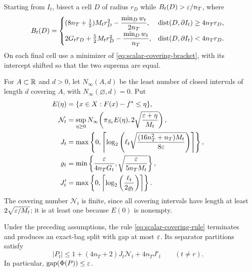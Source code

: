 Starting from $I_t$, bisect a cell $D$ of radius $r_D$ while
$B_t(D)>\varepsilon/n_T$, where
\begin{equation}
 B_t(D)=
 \begin{cases}
  (8n_T+\tfrac12)M_t r_D^2-\dfrac{\min_D w_t}{2n_T},
     &\operatorname{dist}(D,\partial I_t)\geq4n_T r_D,\\[2mm]
  2G_t r_D+\tfrac52M_t r_D^2-\dfrac{\min_D w_t}{n_T},
     &\operatorname{dist}(D,\partial I_t)<4n_T r_D.
 \end{cases}
 \label{eq:scalar-covering-rule}
\end{equation}
On each final cell use a minimizer of
\eqref{eq:scalar-covering-bracket}, with its intercept shifted so that
the two suprema are equal.

For $A\subset\mathbb R$ and $d>0$, let $N_\infty(A,d)$ be the least number of
closed intervals of length $d$ covering $A$, with
$N_\infty(\varnothing,d)=0$.  Put
\begin{align}
 E(\eta)&=\{x\in X:F(x)-f^*\leq\eta\},\\
 \mathcal N_t&=\sup_{\eta\geq0}
 N_\infty\!\left(\pi_{S_t}E(\eta),
                   2\sqrt{\frac{\varepsilon+\eta}{M_t}}\right),\\
 J_t&=\max\left\{0,
 \left\lceil \log_2\left(\ell_t\sqrt{
             \frac{(16n_T^2+n_T)M_t}{8\varepsilon}}\right)\right\rceil\right\},\\
 \varrho_t&=\min\left\{\frac{\varepsilon}{4n_T G_t},
                         \sqrt{\frac{\varepsilon}{5n_T M_t}}\right\},\\
 J'_t&=\max\left\{0,\left\lceil \log_2
                      \left(\frac{\ell_t}{2\varrho_t}\right)\right\rceil\right\}.
 \label{eq:scalar-covering-numbers}
\end{align}
The covering number $\mathcal N_t$ is finite, since all covering
intervals have length at least $2\sqrt{\varepsilon/M_t}$; it is at least one
because $E(0)$ is nonempty.

\begin{theorem}
\label{thm:scalar-covering}
Under the preceding assumptions, the rule
\eqref{eq:scalar-covering-rule} terminates and produces an exact-bag
split with gap at most $\varepsilon$.  Its separator partitions satisfy
\begin{equation}
 |P_t|\leq1+(4n_T+2)J_t\mathcal N_t+4n_T J'_t
 \qquad(t\ne r).
 \label{eq:scalar-covering-count}
\end{equation}
In particular, $\operatorname{gap}(\Phi(P))\leq\varepsilon$.
\end{theorem}

